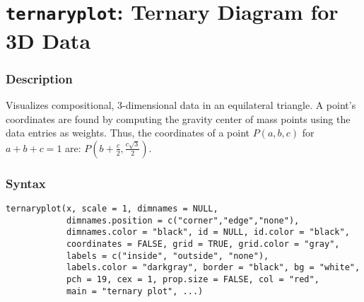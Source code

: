 \section{{\tt ternaryplot}: Ternary Diagram for 3D Data}
\label{ternaryplot}

\subsubsection{Description} 
Visualizes compositional, 3-dimensional data in an equilateral
triangle.   A point's coordinates are found by computing the gravity center
of mass points using the data entries as weights. Thus, the coordinates
of a point $P(a,b,c)$ for $a + b + c = 1$ are: $P(b + \frac{c}{2}, \frac{c
\sqrt{3}}{2})$.

\subsubsection{Syntax}
\begin{verbatim}
ternaryplot(x, scale = 1, dimnames = NULL, 
            dimnames.position = c("corner","edge","none"),
            dimnames.color = "black", id = NULL, id.color = "black", 
            coordinates = FALSE, grid = TRUE, grid.color = "gray", 
            labels = c("inside", "outside", "none"), 
            labels.color = "darkgray", border = "black", bg = "white",
            pch = 19, cex = 1, prop.size = FALSE, col = "red", 
            main = "ternary plot", ...)
\end{verbatim}

